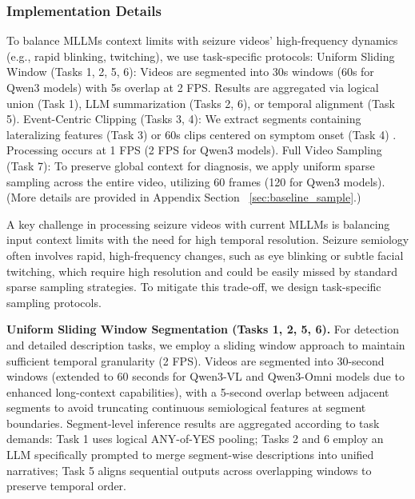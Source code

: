\documentclass{article}
\theoremstyle{plain}
\theoremstyle{definition}
\theoremstyle{remark}
\begin{document}
\subsubsection{Implementation Details}

To balance MLLMs context limits with seizure videos' high-frequency dynamics (e.g., rapid blinking, twitching), we use task-specific protocols: Uniform Sliding Window (Tasks 1, 2, 5, 6): Videos are segmented into 30s windows (60s for Qwen3 models) with 5s overlap at 2 FPS. Results are aggregated via logical union (Task 1), LLM summarization (Tasks 2, 6), or temporal alignment (Task 5). Event-Centric Clipping (Tasks 3, 4): We extract segments containing lateralizing features (Task 3) or 60s clips centered on symptom onset (Task 4) . Processing occurs at 1 FPS (2 FPS for Qwen3 models).  Full Video Sampling (Task 7): To preserve global context for diagnosis, we apply uniform sparse sampling across the entire video, utilizing 60 frames (120 for Qwen3 models). (More details are provided in Appendix Section ~\ref{sec:baseline_sample}.)

\iffalse
A key challenge in processing seizure videos with current MLLMs is balancing input context limits with the need for high temporal resolution. Seizure semiology often involves rapid, high-frequency changes, such as eye blinking or subtle facial twitching, which require high resolution and could be easily missed by standard sparse sampling strategies. To mitigate this trade-off, we design task-specific sampling protocols.

\textbf{Uniform Sliding Window Segmentation (Tasks 1, 2, 5, 6).}
For detection and detailed description tasks, we employ a sliding window approach to maintain sufficient temporal granularity (2 FPS). Videos are segmented into 30-second windows (extended to 60 seconds for Qwen3-VL and Qwen3-Omni models due to enhanced long-context capabilities), with a 5-second overlap between adjacent segments to avoid truncating continuous semiological features at segment boundaries. Segment-level inference results are aggregated according to task demands: Task 1 uses logical ANY-of-YES pooling; Tasks 2 and 6 employ an LLM specifically prompted to merge segment-wise descriptions into unified narratives; Task 5 aligns sequential outputs across overlapping windows to preserve temporal order.
\end{document}
